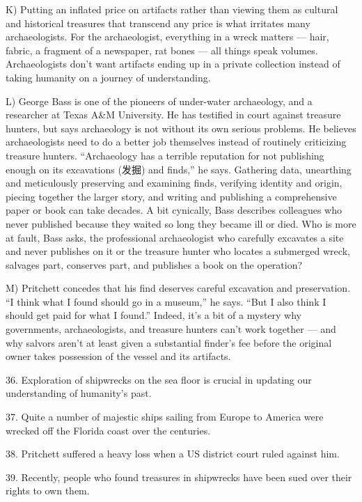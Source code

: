 \documentclass[UTF8,11pt]{ctexart}
\begin{document}
K) Putting an inflated price on artifacts rather than viewing them as cultural and historical treasures that transcend any price is what irritates many archaeologists. For the archaeologist, everything in a wreck matters — hair, fabric, a fragment of a newspaper, rat bones — all things speak volumes. Archaeologists don’t want artifacts ending up in a private collection instead of taking humanity on a journey of understanding.


L) George Bass is one of the pioneers of under-water archaeology, and a researcher at Texas A\&M University. He has testified in court against treasure hunters, but says archaeology is not without its own serious problems. He believes archaeologists need to do a better job themselves instead of routinely criticizing treasure hunters. “Archaeology has a terrible reputation for not publishing enough on its excavations (发掘) and finds,” he says. Gathering data, unearthing and meticulously preserving and examining finds, verifying identity and origin, piecing together the larger story, and writing and publishing a comprehensive paper or book can take decades. A bit cynically, Bass describes colleagues who never published because they waited so long they became ill or died. Who is more at fault, Bass asks, the professional archaeologist who carefully excavates a site and never publishes on it or the treasure hunter who locates a submerged wreck, salvages part, conserves part, and publishes a book on the operation?


M) Pritchett concedes that his find deserves careful excavation and preservation. “I think what I found should go in a museum,” he says. “But I also think I should get paid for what I found.” Indeed, it’s a bit of a mystery why governments, archaeologists, and treasure hunters can’t work together — and why salvors aren’t at least given a substantial finder’s fee before the original owner takes possession of the vessel and its artifacts.


36. Exploration of shipwrecks on the sea floor is crucial in updating our understanding of humanity’s past.


37. Quite a number of majestic ships sailing from Europe to America were wrecked off the Florida coast over the centuries.


38. Pritchett suffered a heavy loss when a US district court ruled against him.


39. Recently, people who found treasures in shipwrecks have been sued over their rights to own them.
\end{document}
